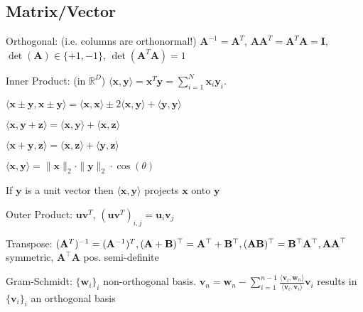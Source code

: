 \documentclass[a4paper, 11pt, landscape]{article}
\begin{document}
\begin{multicols*}{3}
\section{Matrix/Vector}
\begin{compactdesc}
	\item[Orthogonal:] (i.e. columns are orthonormal!) $\mathbf{A}^{-1} = \mathbf{A}^T$, $\mathbf{A} \mathbf{A}^T = \mathbf{A}^T \mathbf{A} = \mathbf{I}$, $\operatorname{det}(\mathbf{A}) \in \{+1, -1\}$, $\operatorname{det}(\mathbf{A}^T \mathbf{A}) = 1$
	\item[Inner Product:] (in $\mathbb{R}^D$) $\langle \mathbf{x}, \mathbf{y} \rangle = \mathbf{x}^T \mathbf{y} = \sum_{i=1}^{N} \mathbf{x}_i \mathbf{y}_i$.
	\begin{inparaitem}[\color{red}\textbullet]
		\item $\langle \mathbf{x} \pm \mathbf{y}, \mathbf{x} \pm \mathbf{y} \rangle = \langle \mathbf{x}, \mathbf{x} \rangle \pm 2 \langle \mathbf{x}, \mathbf{y} \rangle + \langle \mathbf{y}, \mathbf{y} \rangle$
		\item $\langle \mathbf{x}, \mathbf{y} + \mathbf{z} \rangle = \langle \mathbf{x}, \mathbf{y} \rangle + \langle \mathbf{x}, \mathbf{z} \rangle$
		\item $\langle \mathbf{x} + \mathbf{y}, \mathbf{z} \rangle = \langle \mathbf{x}, \mathbf{z} \rangle + \langle \mathbf{y}, \mathbf{z} \rangle$
		\item $\langle \mathbf{x}, \mathbf{y} \rangle = \|\mathbf{x}\|_2 \cdot \|\mathbf{y}\|_2 \cdot \cos(\theta)$
		\item If $\mathbf{y}$ is a unit vector then $\langle \mathbf{x}, \mathbf{y} \rangle$ projects $\mathbf{x}$ onto $\mathbf{y}$
	\end{inparaitem}
	\item[Outer Product:] $\mathbf{u} \mathbf{v}^T$, $(\mathbf{u} \mathbf{v}^T)_{i, j} = \mathbf{u}_i \mathbf{v}_j$
	\item[Transpose:] $(\mathbf{A}^T)^{-1} = (\mathbf{A}^{-1})^T,
	(\mathbf{A+B})^\top = \mathbf{A}^\top + \mathbf{B}^\top,\\
	(\mathbf{AB})^\top = \mathbf{B}^\top \mathbf{A}^\top,
	\mathbf{AA}^\top$ symmetric,
	$\mathbf{A}^\top\mathbf{A}$ pos. semi-definite
	\item[Gram-Schmidt:] $\{\mathbf{w}_i\}_i$ non-orthogonal basis. $\mathbf{v}_n = \mathbf{w}_n - \sum_{i=1}^{n-1} \frac{\langle \mathbf{v}_i, \mathbf{w}_n \rangle}{\langle \mathbf{v}_i, \mathbf{v}_i \rangle} \mathbf{v}_i$ results in $\{\mathbf{v}_i\}_i$ an orthogonal basis
\end{compactdesc}


\end{multicols*}
\end{document}
